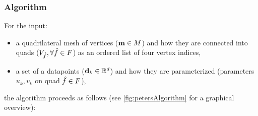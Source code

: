 \subsubsection*{Algorithm}
For the input:
\begin{itemize}
\item a quadrilateral mesh of vertices ($\petersControlMeshVec \in \petersControlMesh$) and how they are connected into quads ($\verticesof{\hat{f}}, \forall \hat{f} \in \petersFaces$) as an ordered list of four vertex indices,
\item a set of a datapoints ($\lsDataPoint_k \in \mathbb{R}^d$) and how they are parameterized (parameters $u_k, v_k$ on quad $\hat{f}\in\petersFaces$),
\end{itemize}
the algorithm proceeds as follows (see \autoref{fig:petersAlgorithm} for a graphical overview):
